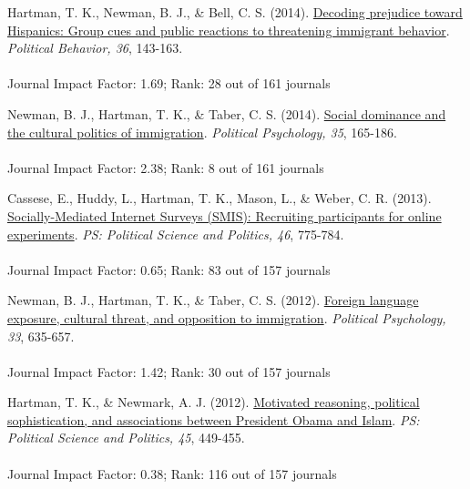 \documentclass[12pt]{article}
\begin{document}
\begin{bibenum}
    \item {Hartman, T. K.}, Newman, B. J., \& Bell, C. S. (2014). 
          \href{http://tkhartman.staff.shef.ac.uk/_content/documents/Hartman.Newman.Bell.2014.Political.Behavior.pdf}
          {Decoding prejudice toward Hispanics: 
			Group cues and public reactions to threatening immigrant behavior}.
          \emph{Political Behavior, 36}, 143-163.\\
          \\
          Journal Impact Factor: 1.69; Rank: 28 out of 161 journals
  
    \item Newman, B. J., {Hartman, T. K.}, \& Taber, C. S. (2014). 
          \href{http://tkhartman.staff.shef.ac.uk/_content/documents/Newman.Hartman.Taber.2014.Political.Psychology.pdf}
          {Social dominance and the cultural politics of immigration}. 
          \emph{Political Psychology, 35}, 165-186.\\
          \\
          Journal Impact Factor: 2.38; Rank: 8 out of 161 journals

    \item Cassese, E., Huddy, L., {Hartman, T. K.}, Mason, L., 
          \& Weber, C. R. (2013). 
          \href{http://tkhartman.staff.shef.ac.uk/_content/documents/Cassese.Huddy.Hartman.Mason.Weber.2013.PS.pdf}
          {Socially-Mediated Internet Surveys (SMIS): 
          Recruiting participants for online experiments}. 
          \emph{PS: Political Science and Politics, 46}, 775-784.\\
          \\
          Journal Impact Factor: 0.65; Rank: 83 out of 157 journals

    \item Newman, B. J., {Hartman, T. K.}, \& Taber, C. S. (2012). 
          \href{http://tkhartman.staff.shef.ac.uk/_content/documents/Newman.Hartman.Taber.2012.Political.Psychology.pdf}
          {Foreign language exposure, cultural threat, and opposition to immigration}. 
          \emph{Political Psychology, 33}, 635-657.\\
          \\
          Journal Impact Factor: 1.42; Rank: 30 out of 157 journals

    \item {Hartman, T. K.}, \& Newmark, A. J. (2012). 
          \href{http://tkhartman.staff.shef.ac.uk/_content/documents/Hartman.Newmark.2012.PS.pdf}
          {Motivated reasoning, political sophistication, 
          and associations between President Obama and Islam}. 
          \emph{PS: Political Science and Politics, 45}, 449-455.\\		
          \\
          Journal Impact Factor: 0.38; Rank: 116 out of 157 journals


\end{bibenum}
\end{document}
